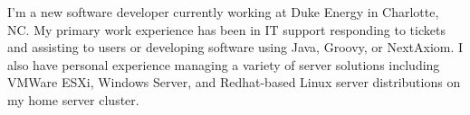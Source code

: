 

\begin{cvparagraph}


I'm a new software developer currently working at Duke Energy in Charlotte, NC. My primary work experience has been in IT support responding to tickets and assisting to users or developing software using Java, Groovy, or NextAxiom. I also have personal experience managing a variety of server solutions including VMWare ESXi, Windows Server, and Redhat-based Linux server distributions on my home server cluster. 

\end{cvparagraph}
